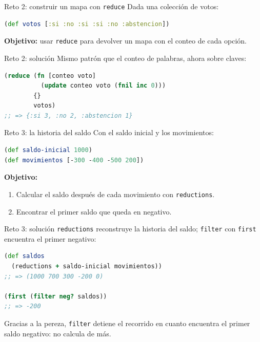 \documentclass{beamer}
\begin{document}
\begin{frame}[fragile]{Reto 2: construir un mapa con \texttt{reduce}}
    Dada una colección de votos:

    \begin{lstlisting}[language=Clojure]
(def votos [:si :no :si :si :no :abstencion])
    \end{lstlisting}

    \textbf{Objetivo:} usar \texttt{reduce} para devolver un mapa con el conteo de cada opción.
\end{frame}

\begin{frame}[fragile]{Reto 2: solución}
    Mismo patrón que el conteo de palabras, ahora sobre claves:

    \begin{lstlisting}[language=Clojure]
(reduce (fn [conteo voto]
          (update conteo voto (fnil inc 0)))
        {}
        votos)
;; => {:si 3, :no 2, :abstencion 1}
    \end{lstlisting}
\end{frame}

\begin{frame}[fragile]{Reto 3: la historia del saldo}
    Con el saldo inicial y los movimientos:

    \begin{lstlisting}[language=Clojure]
(def saldo-inicial 1000)
(def movimientos [-300 -400 -500 200])
    \end{lstlisting}

    \textbf{Objetivo:}
    \begin{enumerate}
        \item Calcular el saldo después de cada movimiento con \texttt{reductions}.
        \item Encontrar el primer saldo que queda en negativo.
    \end{enumerate}
\end{frame}

\begin{frame}[fragile]{Reto 3: solución}
    \texttt{reductions} reconstruye la historia del saldo; \texttt{filter} con \texttt{first} encuentra el primer negativo:

    \begin{lstlisting}[language=Clojure]
(def saldos
  (reductions + saldo-inicial movimientos))
;; => (1000 700 300 -200 0)

(first (filter neg? saldos))
;; => -200
    \end{lstlisting}

    Gracias a la pereza, \texttt{filter} detiene el recorrido en cuanto encuentra el primer saldo negativo: no calcula de más.
\end{frame}
\end{document}

